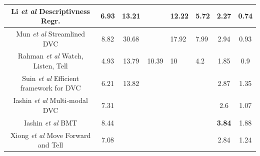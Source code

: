 \begin{table}[h]
\begin{tabular}{|c|cclllcc|}
		{Li \textit{et al} \cite{li2018jointly} Descriptivness Regr.}          & \multicolumn{1}{c|}{6.93}          & \multicolumn{1}{c|}{13.21}          & \multicolumn{1}{l|}{}                & \multicolumn{1}{l|}{12.22}           & \multicolumn{1}{l|}{5.72}          & \multicolumn{1}{c|}{2.27}          & 0.74                               \\ \hline
		{Mun \textit{et al} \cite{mun2019streamlined} Streamlined DVC}               & \multicolumn{1}{c|}{8.82}          & \multicolumn{1}{c|}{30.68}          & \multicolumn{1}{l|}{}                & \multicolumn{1}{l|}{17.92}           & \multicolumn{1}{l|}{7.99}          & \multicolumn{1}{c|}{2.94}          & 0.93                               \\ \hline
		Rahman \textit{et al} \cite{rahman2019watch} Watch, Listen, Tell       & \multicolumn{1}{c|}{4.93}          & \multicolumn{1}{c|}{13.79}          & \multicolumn{1}{l|}{10.39}           & \multicolumn{1}{l|}{10}              & \multicolumn{1}{l|}{4.2}           & \multicolumn{1}{c|}{1.85}          & 0.9                                \\ \hline
		Suin \textit{et al} \cite{suin2020efficient} Efficient framework for DVC & \multicolumn{1}{c|}{6.21}          & \multicolumn{1}{c|}{13.82}          & \multicolumn{1}{l|}{}                & \multicolumn{1}{l|}{}                & \multicolumn{1}{l|}{}              & \multicolumn{1}{c|}{2.87}          & 1.35                               \\ \hline
		Iashin \textit{et al} \cite{iashin2020multimodal} Multi-modal DVC            & \multicolumn{1}{c|}{7.31}          & \multicolumn{1}{l|}{}               & \multicolumn{1}{l|}{}                & \multicolumn{1}{l|}{}                & \multicolumn{1}{l|}{}              & \multicolumn{1}{c|}{2.6}           & 1.07                               \\ \hline
		Iashin \textit{et al} \cite{iashin2020better} BMT                       & \multicolumn{1}{c|}{8.44}          & \multicolumn{1}{l|}{}               & \multicolumn{1}{l|}{}                & \multicolumn{1}{l|}{}                & \multicolumn{1}{l|}{}              & \multicolumn{1}{c|}{\textbf{3.84}}          & 1.88                               \\ \hline
		Xiong \textit{et al} \cite{xiong2018forward} Move Forward and Tell      & \multicolumn{1}{c|}{7.08}          & \multicolumn{1}{l|}{}               & \multicolumn{1}{l|}{}                & \multicolumn{1}{l|}{}                & \multicolumn{1}{l|}{}              & \multicolumn{1}{c|}{2.84}          & 1.24                               \\ \hline

\end{tabular}
\end{table}
